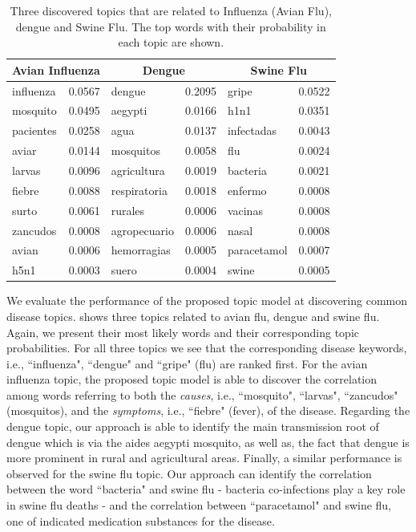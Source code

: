 \documentclass[twoside,leqno,twocolumn]{article}
\begin{document}
\begin{table}[t]
\scriptsize
\begin{center}
\captionsetup{font=scriptsize}
\caption{Three discovered topics that are related to Influenza (Avian Flu), dengue and Swine Flu. The top words with their probability in each topic are shown.}
\begin{tabular}{|lr|lr|lr|}
\hline
\multicolumn{2}{|c|}{\bf Avian Influenza} & \multicolumn{2}{|c|}{\bf Dengue} & 
\multicolumn{2}{|c|}{\bf Swine Flu} \\ \hline 
influenza & 0.0567 & dengue & 0.2095 & gripe & 0.0522 \\
mosquito & 0.0495 & aegypti & 0.0166 & h1n1 & 0.0351 \\
pacientes & 0.0258 & agua & 0.0137  & infectadas &0.0043 \\
aviar & 0.0144 & mosquitos & 0.0058  & flu & 0.0024\\
larvas & 0.0096 & agricultura & 0.0019 & bacteria & 0.0021 \\
fiebre & 0.0088 & respiratoria & 0.0018 & enfermo & 0.0008 \\
surto & 0.0061 & rurales & 0.0006 & vacinas & 0.0008 \\
zancudos & 0.0008 & agropecuario	 & 0.0006 & nasal & 0.0008 \\
avian & 0.0006 & hemorragias & 0.0005 & paracetamol & 0.0007 \\
h5n1 & 0.0003 & suero & 0.0004 & swine & 0.0005 \\
\hline
\end{tabular}\label{tab:common_topics}
\end{center}
\end{table}

We evaluate the performance of the proposed topic model at discovering common disease topics.  shows three topics related to avian flu, dengue and swine flu. Again, we present their most likely words and their corresponding topic probabilities. For all three topics we see that the corresponding disease keywords, i.e., ``influenza",  ``dengue" and ``gripe" (flu) are ranked first. For the avian influenza topic, the proposed topic model is able to discover the correlation among words referring to both the {\em causes}, i.e., ``mosquito", ``larvas", ``zancudos" (mosquitos), and the {\em symptoms}, i.e., ``fiebre" (fever), of the disease. Regarding the dengue topic, our approach is able to identify the main transmission root of dengue which is via the aides aegypti mosquito, as well as, the fact that dengue is more prominent in rural and agricultural areas. Finally, a similar performance is observed for the swine flu topic. Our approach can identify the correlation between the word ``bacteria" and swine flu - bacteria co-infections play a key role in swine flu deaths - and the correlation between ``paracetamol" and swine flu, one of indicated medication substances for the disease.
\end{document}
